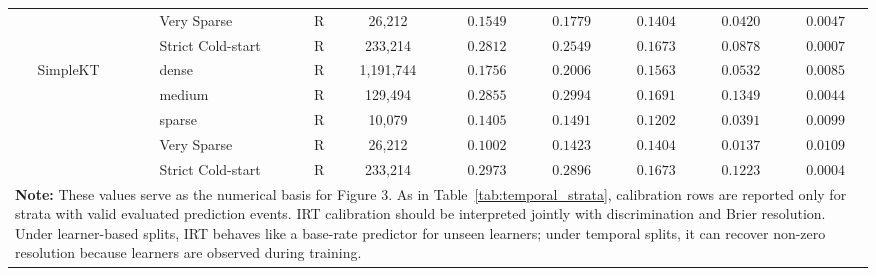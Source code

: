 \begin{table}[htbp]
{\begin{tabular}{lllrcccccc}
 &  & Very Sparse & R & 26,212 & $0.1549$ & $0.1779$ & $0.1404$ & $0.0420$ & $0.0047$ \\
 &  & Strict Cold-start & R & 233,214 & $0.2812$ & $0.2549$ & $0.1673$ & $0.0878$ & $0.0007$ \\
 & SimpleKT & dense & R & 1,191,744 & $0.1756$ & $0.2006$ & $0.1563$ & $0.0532$ & $0.0085$ \\
 &  & medium & R & 129,494 & $0.2855$ & $0.2994$ & $0.1691$ & $0.1349$ & $0.0044$ \\
 &  & sparse & R & 10,079 & $0.1405$ & $0.1491$ & $0.1202$ & $0.0391$ & $0.0099$ \\
 &  & Very Sparse & R & 26,212 & $0.1002$ & $0.1423$ & $0.1404$ & $0.0137$ & $0.0109$ \\
 &  & Strict Cold-start & R & 233,214 & $0.2973$ & $0.2896$ & $0.1673$ & $0.1223$ & $0.0004$ \\
\bottomrule
\multicolumn{10}{p{17.5cm}}{\scriptsize \textbf{Note:} These values serve as the numerical basis for Figure 3. As in Table~\ref{tab:temporal_strata}, calibration rows are reported only for strata with valid evaluated prediction events. IRT calibration should be interpreted jointly with discrimination and Brier resolution. Under learner-based splits, IRT behaves like a base-rate predictor for unseen learners; under temporal splits, it can recover non-zero resolution because learners are observed during training.} \\
\end{tabular}%
}
\end{table}
